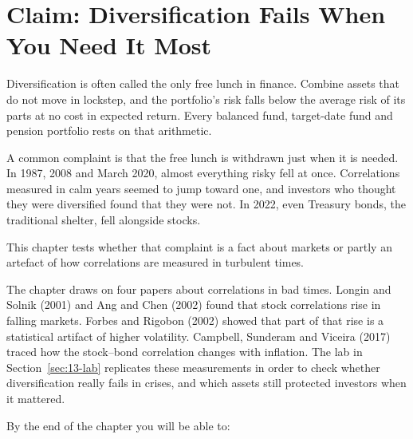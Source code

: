 \makeatletter
{}
\makeatother

\chapter{Claim: Diversification Fails When You Need It Most}
\label{ch:13}

Diversification is often called the only free lunch in finance. Combine assets that do not move in lockstep, and the portfolio's risk falls below the average risk of its parts at no cost in expected return. Every balanced fund, target-date fund and pension portfolio rests on that arithmetic.

A common complaint is that the free lunch is withdrawn just when it is needed. In 1987, 2008 and March 2020, almost everything risky fell at once. Correlations measured in calm years seemed to jump toward one, and investors who thought they were diversified found that they were not. In 2022, even Treasury bonds, the traditional shelter, fell alongside stocks.

This chapter tests whether that complaint is a fact about markets or partly an artefact of how correlations are measured in turbulent times.

The chapter draws on four papers about correlations in bad times. Longin and Solnik (2001) and Ang and Chen (2002) found that stock correlations rise in falling markets. Forbes and Rigobon (2002) showed that part of that rise is a statistical artifact of higher volatility. Campbell, Sunderam and Viceira (2017) traced how the stock--bond correlation changes with inflation. The lab in Section~\ref{sec:13-lab} replicates these measurements in order to check whether diversification really fails in crises, and which assets still protected investors when it mattered.

By the end of the chapter you will be able to:

